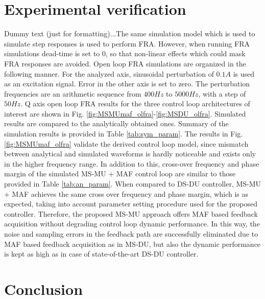 \documentclass[journal]{IEEEtran}
\begin{document}
\section{Experimental verification}
Dummy text (just for formatting)...The same simulation model which is used to simulate step responses is used to perform FRA. However, when running FRA simulations  dead-time is set to $0$, so that non-linear effects which could mask FRA responses are avoided. Open loop FRA simulations are organized in the following manner. For the analyzed axis, sinusoidal perturbation of $0.1 A$ is used as an excitation signal. Error in the other axis is set to zero. The perturbation frequencies are an arithmetic sequence from $400 Hz$ to $5000 Hz$, with a step of $50 Hz$. Q axis open loop FRA results for the three control loop architectures of interest are shown in Fig. \ref{fig:MSMUmaf_olfra}-\ref{fig:MSDU_olfra}. Simulated results are compared to the analytically obtained ones. Summary of the simulation results is provided in Table \ref{tab:sym_param}. The results in Fig. \ref{fig:MSMUmaf_olfra} validate the derived control loop model, since mismatch between analytical and simulated waveforms is hardly noticeable and exists only in the higher frequency range. In addition to this, cross-over frequency and phase margin of the simulated MS-MU + MAF control loop are similar to those provided in Table \ref{tab:an_param}. When compared to DS-DU controller, MS-MU + MAF achieves the same cross over frequency and phase margin, which is as expected, taking into account parameter setting procedure used for the proposed controller. Therefore, the proposed MS-MU approach offers MAF based feedback acquisition without degrading control loop dynamic performance. In this way, the noise and sampling errors in the feedback path are successfully eliminated due to MAF based feedback acquisition as in MS-DU, but also the dynamic performance is kept as high as in case of state-of-the-art DS-DU controller. \par
\section{Conclusion}


\ifCLASSOPTIONcaptionsoff
  \newpage
\fi



\end{document}
